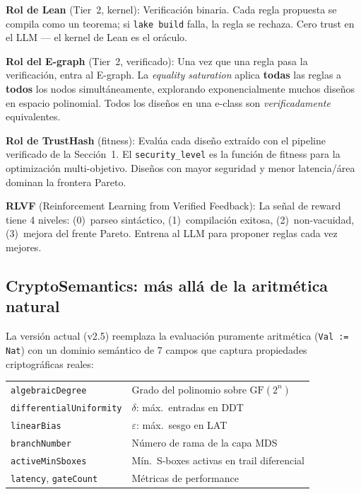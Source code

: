 \documentclass[11pt,a4paper]{article}
\begin{document}
\textbf{Rol de Lean} (Tier~2, kernel): Verificación binaria. Cada regla propuesta se compila como un teorema; si \texttt{lake build} falla, la regla se rechaza. Cero trust en el LLM --- el kernel de Lean es el oráculo.

\textbf{Rol del E-graph} (Tier~2, verificado): Una vez que una regla pasa la verificación, entra al E-graph. La \emph{equality saturation} aplica \textbf{todas} las reglas a \textbf{todos} los nodos simultáneamente, explorando exponencialmente muchos diseños en espacio polinomial. Todos los diseños en una e-class son \emph{verificadamente} equivalentes.

\textbf{Rol de TrustHash} (fitness): Evalúa cada diseño extraído con el pipeline verificado de la Sección~1. El \texttt{security\_level} es la función de fitness para la optimización multi-objetivo. Diseños con mayor seguridad y menor latencia/área dominan la frontera Pareto.

\textbf{RLVF} (Reinforcement Learning from Verified Feedback): La señal de reward tiene 4 niveles: (0)~parseo sintáctico, (1)~compilación exitosa, (2)~non-vacuidad, (3)~mejora del frente Pareto. Entrena al LLM para proponer reglas cada vez mejores.

\subsection{CryptoSemantics: más allá de la aritmética natural}

La versión actual (v2.5) reemplaza la evaluación puramente aritmética (\texttt{Val := Nat}) con un dominio semántico de 7 campos que captura propiedades criptográficas reales:

\begin{center}
\small
\begin{tabular}{ll}
\texttt{algebraicDegree} & Grado del polinomio sobre $\text{GF}(2^n)$ \\
\texttt{differentialUniformity} & $\delta$: máx.\ entradas en DDT \\
\texttt{linearBias} & $\varepsilon$: máx.\ sesgo en LAT \\
\texttt{branchNumber} & Número de rama de la capa MDS \\
\texttt{activeMinSboxes} & Mín.\ S-boxes activas en trail diferencial \\
\texttt{latency}, \texttt{gateCount} & Métricas de performance \\
\end{tabular}
\end{center}
\end{document}
